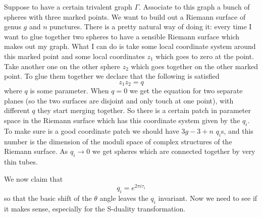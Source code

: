 Suppose to have a certain trivalent graph $\Gamma$. Associate to this graph a bunch of spheres with three marked points. We want to build out a Riemann surface of genus $g$ and $n$ punctures. There is a pretty natural way of doing it: every time I want to glue together two spheres to have a sensible Riemann surface which makes out my graph. What I can do is take some local coordinate system around this marked point and some local coordinates $z_{1}$ which goes to zero at the point. Take another one on the other sphere $z_{2}$ which goes together on the other marked point. To glue them together we declare that the following is satisfied
\begin{equation}
	z_{1}z_{2}=q
\end{equation}
where $q$ is some parameter. When $q=0$ we get the equation for two separate planes (so the two surfaces are disjoint and only touch at one point), with different $q$ they start merging together. So there is a certain patch in parameter space in the Riemann surface which has this coordinate system given by the $q_{i}$. To make sure is a good coordinate patch we should have $3g-3+n$ $q_{i}$s, and this number is the dimension of the moduli space of complex structures of the Riemann surface. As $q_{i}\rightarrow 0$ we get spheres which are connected together by very thin tubes.

We now claim that 
\begin{equation}
	q_{i}=e^{2\pi i\tau_{i}}
\end{equation}
so that the basic shift of the $\theta$ angle leaves the $q_{i}$ invariant. Now we need to see if it makes sense, especially for the S-duality transformation.

